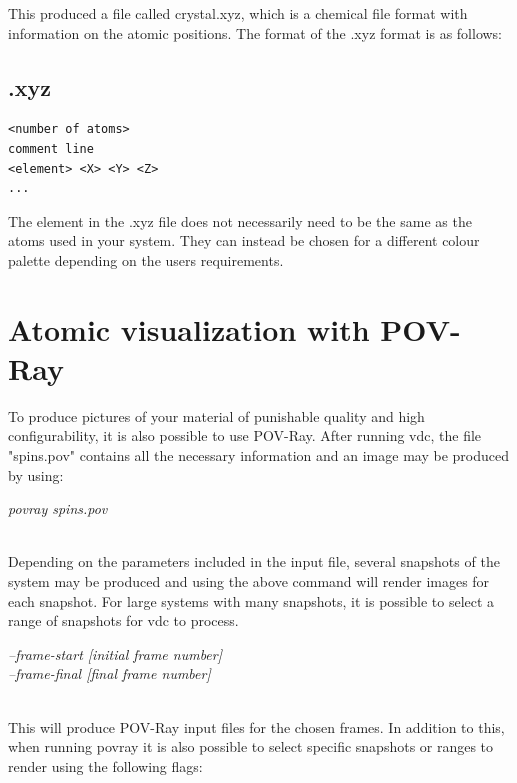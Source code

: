 This produced a file called crystal.xyz, which is a chemical file format with information on the atomic positions. The format of the .xyz format is as follows:\\

\subsection*{.xyz}
{\footnotesize
\begin{verbatim}
<number of atoms>
comment line
<element> <X> <Y> <Z>
...
\end{verbatim}
}

The element in the .xyz file does not necessarily need to be the same as the atoms used in your system. They can instead be chosen for a different colour palette depending on the users requirements.

\section*{Atomic visualization with POV-Ray}

To produce pictures of your material of punishable quality and high configurability, it is also possible to use POV-Ray. After running vdc, the file "spins.pov" contains all the necessary information and an image may be produced by using:

\begin{minipage}[c]{\textwidth}
\centering
\textit{povray spins.pov}
\end{minipage}\\

Depending on the parameters included in the input file, several snapshots of the system may be produced and using the above command will render images for each snapshot. For large systems with many snapshots, it is possible to select a range of snapshots for vdc to process.

\begin{minipage}[c]{\textwidth}
\centering
\textit{--frame-start [initial frame number]\\
--frame-final [final frame number]}
\end{minipage}\\

This will produce POV-Ray input files for the chosen frames. In addition to this, when running povray it is also possible to select specific snapshots or ranges to render using the following flags:

